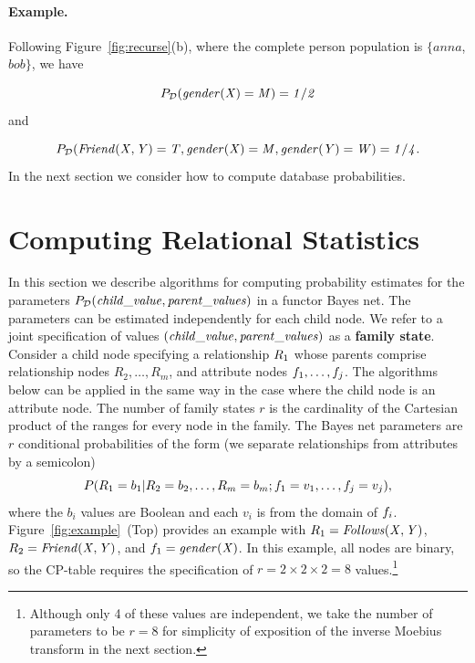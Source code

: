 \documentclass[oribibl]{llncs}
\begin{document}
\paragraph{Example.} Following Figure~\ref{fig:recurse}(b), where the complete person population is $\{anna$, $bob\}$, we have 

$$P_{\mathcal{D}}(\it{gender}(X) = M) = 1/2$$ and

$$P_{\mathcal{D}}(\it{Friend}(X,Y) = \mathit{T}, \it{gender}(X) = M, \it{gender}(Y) = W) = 1/4.$$ 
%
%
In the next section we consider how
to compute database probabilities.


\section{Computing Relational Statistics} \label{sec:mobius}

In this section we describe algorithms for computing  probability estimates for the parameters $P_{\mathcal{D}}(\it{child}\_value,\it{parent}\_\it{values})$ in a functor Bayes net. The parameters can be estimated independently for each child node. We refer to a joint specification of values $(\it{child}\_value,\it{parent}\_\it{values})$ as a \textbf{family state}. Consider a child node specifying a relationship $R_{1}$ whose parents comprise relationship nodes $R_{2},\ldots,R_{m}$, and attribute nodes $f_{1},\ldots,f_{j}$. The algorithms below can be applied in the same way in the case where the child node is an attribute node. The number of family states $r$ is the cardinality of the Cartesian product of the ranges for every node in the family.
 The Bayes net parameters are $r$ conditional probabilities of the form (we separate relationships from attributes by a semicolon)
\begin{equation} \label{eq:cond-prob}
P(R_{1} = b_{1}| R_{2} = b_{2},\ldots, R_{m} = b_{m}; f_{1} = v_{1},\ldots,f_{j} = v_{j}),
\end{equation}
where the $b_{i}$ values are Boolean and each $v_{i}$ is from the domain of $f_{i}$. 
Figure~\ref{fig:example}~(Top) provides an example with $R_{1} = \it{Follows}(X,Y)$, $R_{2} = \it{Friend}(X,Y)$, and $f_{1} = \it{gender}(X)$. In this example, all nodes are binary, so the CP-table requires the specification of $r= 2 \times 2 \times 2 = 8$ values.\footnote{Although only 4 of these values are independent, we take the number of parameters to be $r = 8$ for simplicity of exposition of the inverse Moebius transform in the next section.}
\end{document}

